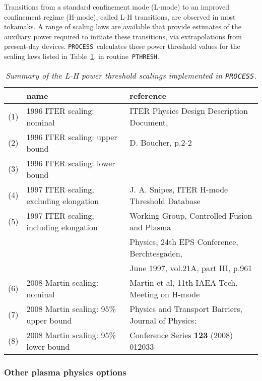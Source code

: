 \documentclass[11pt,a4paper]{report}
\newcommand{\process}{\mbox{\texttt{PROCESS}}}
\begin{document}
Transitions from a standard confinement mode (L-mode) to an improved
confinement regime (H-mode), called L-H transitions, are observed in most
tokamaks. A range of scaling laws are available that provide estimates of the
auxiliary power required to initiate these transitions, via extrapolations
from present-day devices. \process\ calculates these power threshold values
for the scaling laws listed in Table~\ref{tab:power_thresholds}, in
routine~\texttt{PTHRESH}.


\begin{table}[tbph]
\small
\begin{center}
\begin{tabular}{||c||l||l||} \hline
 & name & reference \\ \hline
(1) & 1996 ITER scaling: nominal & ITER Physics Design Description Document, \\
(2) & 1996 ITER scaling: upper bound & D. Boucher, p.2-2 \\
(3) & 1996 ITER scaling: lower bound &  \\ \hline
(4) & 1997 ITER scaling, excluding elongation & J. A. Snipes, ITER H-mode
Threshold Database \\
(5) & 1997 ITER scaling, including elongation &  Working Group, Controlled
Fusion and Plasma \\
 & & Physics, 24th EPS Conference, Berchtesgaden, \\
 & & June 1997, vol.21A, part III, p.961 \\ \hline
(6) & 2008 Martin scaling: nominal & Martin et al, 11th IAEA Tech. Meeting on
H-mode \\
(7) & 2008 Martin scaling: 95\% upper bound &  Physics and Transport Barriers,
Journal of Physics: \\
(8) & 2008 Martin scaling: 95\% lower bound & Conference Series \textbf{123}
(2008) 012033 \\
\hline
\end{tabular}
\end{center}
\normalsize
\caption[List of available L-H power threshold scalings]
{\label{tab:power_thresholds}
  \textit{Summary of the L-H power threshold scalings implemented in \process.}
}
\end{table}

\subsubsection{Other plasma physics options}
\end{document}
